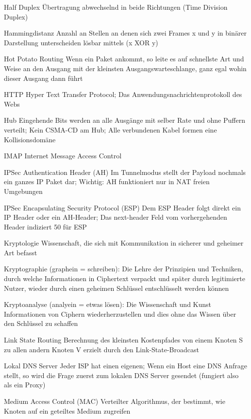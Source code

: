 \documentclass[a4paper]{article}
\begin{document}
\begin{multicols}{3}
\begin{description*}
        \item[Half Duplex] Übertragung abwechselnd in beide Richtungen (Time Division Duplex)
        \item[Hammingdistanz] Anzahl an Stellen an denen sich zwei Frames x und y in binärer Darstellung unterscheiden lösbar mittels (x XOR y)
        \item[Hot Potato Routing] Wenn ein Paket ankommt, so leite es auf schnellste Art und Weise an den Ausgang mit der kleinsten Ausgangswarteschlange, ganz egal wohin dieser Ausgang dann führt
        \item[HTTP] Hyper Text Transfer Protocol; Das Anwendungsnachrichtenprotokoll des Webs
        \item[Hub] Eingehende Bits werden an alle Ausgänge mit selber Rate und ohne Puffern verteilt; Kein CSMA-CD am Hub; Alle verbundenen Kabel formen eine Kollisionsdomäne
        \item[IMAP] Internet Message Access Control
        \item[IPSec Authentication Header (AH)] Im Tunnelmodus stellt der Payload nochmals ein ganzes IP Paket dar; Wichtig: AH funktioniert nur in NAT freien Umgebungen
        \item[IPSec Encapsulating Security Protocol (ESP)] Dem ESP Header folgt direkt ein IP Header oder ein AH-Header; Das next-header Feld vom vorhergehenden Header indiziert 50 für ESP
        \item[Kryptologie] Wissenschaft, die sich mit Kommunikation in sicherer und geheimer Art befasst
        \item[Kryptographie] (graphein = schreiben): Die Lehre der Prinzipien und Techniken, durch welche Informationen in Ciphertext verpackt und später durch legitimierte Nutzer, wieder durch einen geheimen Schlüssel entschlüsselt werden können
        \item[Kryptoanalyse] (analyein = etwas lösen): Die Wissenschaft und Kunst Informationen von Ciphern wiederherzustellen und dies ohne das Wissen über den Schlüssel zu schaffen
        \item[Link State Routing] Berechnung des kleinsten Kostenpfades von einem Knoten S zu allen andern Knoten V erzielt durch den Link-State-Broadcast
        \item[Lokal DNS Server] Jeder ISP hat einen eigenen; Wenn ein Host eine DNS Anfrage stellt, so wird die Frage zuerst zum lokalen DNS Server gesendet (fungiert also als ein Proxy)
        \item[Medium Access Control (MAC)] Verteilter Algorithmus, der bestimmt, wie Knoten auf ein geteiltes Medium zugreifen

\end{description*}
\end{multicols}
\end{document}
